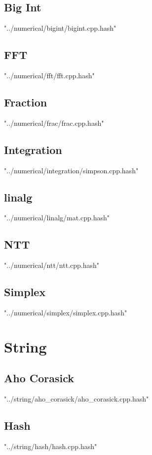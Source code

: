 \documentclass [a4paper,5pt,oneside, landscape]{article}
\begin{document}
\begin{multicols}{3}
\subsection{ Big Int}
 {"../numerical/bigint/bigint.cpp.hash"}


\subsection{ FFT}
 {"../numerical/fft/fft.cpp.hash"}


\subsection{ Fraction}
 {"../numerical/frac/frac.cpp.hash"}


\subsection{ Integration}
 {"../numerical/integration/simpson.cpp.hash"}


\subsection{ linalg}
 {"../numerical/linalg/mat.cpp.hash"}


\subsection{ NTT}
 {"../numerical/ntt/ntt.cpp.hash"}


\subsection{ Simplex}
 {"../numerical/simplex/simplex.cpp.hash"}



\section{String}
\subsection{ Aho Corasick}
 {"../string/aho_corasick/aho_corasick.cpp.hash"}


\subsection{ Hash}
 {"../string/hash/hash.cpp.hash"}



\end{multicols}
\end{document}
